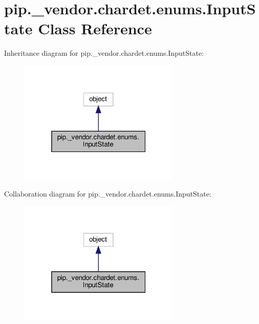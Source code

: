 \hypertarget{classpip_1_1__vendor_1_1chardet_1_1enums_1_1InputState}{}\section{pip.\+\_\+vendor.\+chardet.\+enums.\+Input\+State Class Reference}
\label{classpip_1_1__vendor_1_1chardet_1_1enums_1_1InputState}


Inheritance diagram for pip.\+\_\+vendor.\+chardet.\+enums.\+Input\+State\+:
\nopagebreak
\begin{figure}[H]
\begin{center}
\leavevmode
\includegraphics[width=217pt]{classpip_1_1__vendor_1_1chardet_1_1enums_1_1InputState__inherit__graph}
\end{center}
\end{figure}


Collaboration diagram for pip.\+\_\+vendor.\+chardet.\+enums.\+Input\+State\+:
\nopagebreak
\begin{figure}[H]
\begin{center}
\leavevmode
\includegraphics[width=217pt]{classpip_1_1__vendor_1_1chardet_1_1enums_1_1InputState__coll__graph}
\end{center}
\end{figure}
